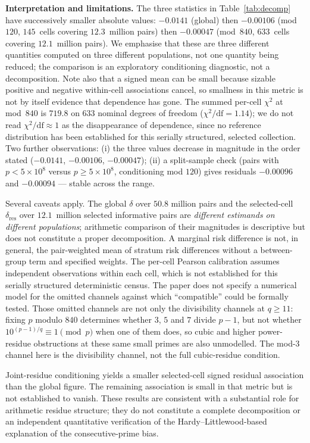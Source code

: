 \documentclass[11pt,reqno]{amsart}
\theoremstyle{plain}
\theoremstyle{definition}
\begin{document}
\textbf{Interpretation and limitations.}
The three statistics in Table~\ref{tab:decomp} have successively smaller
absolute values: $-0.0141$ (global) then $-0.00106$ (mod~$120$, $145$~cells
covering $12.3$~million pairs) then $-0.00047$ (mod~$840$, $633$~cells
covering $12.1$~million pairs). We emphasise that these are three different
quantities computed on three different populations, not one quantity being
reduced; the comparison is an exploratory conditioning diagnostic, not a
decomposition. Note also that a signed mean can be small because sizable
positive and negative within-cell associations cancel, so smallness in this
metric is not by itself evidence that dependence has gone. The summed per-cell
$\chi^2$ at mod~$840$ is $719.8$ on $633$ nominal degrees of freedom
($\chi^2/\mathrm{df} = 1.14$); we do not read $\chi^2/\mathrm{df} \approx 1$
as the disappearance of dependence, since no reference distribution has been
established for this serially structured, selected collection.
Two further observations: (i) the three values decrease in magnitude in the
order stated ($-0.0141$, $-0.00106$, $-0.00047$); (ii) a
split-sample check (pairs with $p < 5 \times 10^8$ versus
$p \ge 5 \times 10^8$, conditioning mod $120$) gives residuals
$-0.00096$ and $-0.00094$ --- stable across the range.

Several caveats apply. The global $\delta$ over $50.8$ million pairs and the
selected-cell $\delta_{\mathrm{res}}$ over $12.1$~million selected informative
pairs are \emph{different estimands on different populations}; arithmetic
comparison of their magnitudes is descriptive but does not constitute a proper
decomposition. A marginal risk difference is not, in general, the pair-weighted
mean of stratum risk differences without a between-group term and specified
weights. The per-cell Pearson calibration assumes independent observations
within each cell, which is not established for this serially structured
deterministic census. The paper does not specify a numerical model for the
omitted channels against which ``compatible'' could be formally tested. Those
omitted channels are not only the divisibility channels at $q \ge 11$:
fixing $p$ modulo $840$ determines whether $3$, $5$ and $7$ divide $p - 1$,
but not whether $10^{(p-1)/q} \equiv 1 \pmod p$ when one of them does, so
cubic and higher power-residue obstructions at these same small primes are
also unmodelled. The mod-$3$ channel here is the divisibility channel, not the
full cubic-residue condition.

Joint-residue conditioning yields a smaller selected-cell signed
residual association than the global figure. The remaining association is small in that metric but is
not established to vanish. These results are consistent with a substantial role
for arithmetic residue structure; they do not constitute a complete
decomposition or an independent quantitative verification of the
Hardy--Littlewood-based explanation of the consecutive-prime bias.
\end{document}

